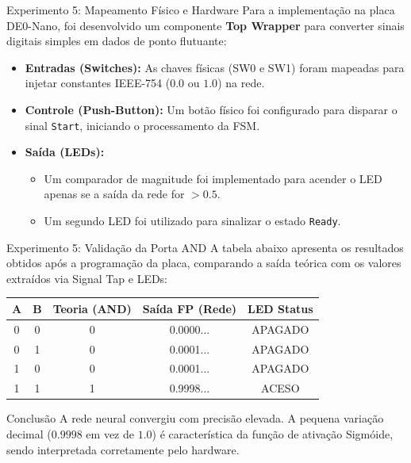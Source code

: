 \documentclass[aspectratio=169]{beamer}
\begin{document}
\begin{frame}{Experimento 5: Mapeamento Físico e Hardware}
	\justifying
	Para a implementação na placa DE0-Nano, foi desenvolvido um componente \textbf{Top Wrapper} para converter sinais digitais simples em dados de ponto flutuante:
	
	\begin{itemize}
		\item \textbf{Entradas (Switches):} As chaves físicas (SW0 e SW1) foram mapeadas para injetar constantes IEEE-754 ($0.0$ ou $1.0$) na rede.
		\item \textbf{Controle (Push-Button):} Um botão físico foi configurado para disparar o sinal \texttt{Start}, iniciando o processamento da FSM.
		\item \textbf{Saída (LEDs):} 
		\begin{itemize}
			\item Um comparador de magnitude foi implementado para acender o LED apenas se a saída da rede for $> 0.5$.
			\item Um segundo LED foi utilizado para sinalizar o estado \texttt{Ready}.
		\end{itemize}
	\end{itemize}
\end{frame}



\begin{frame}{Experimento 5: Validação da Porta AND}
	\justifying
	A tabela abaixo apresenta os resultados obtidos após a programação da placa, comparando a saída teórica com os valores extraídos via Signal Tap e LEDs:
	
	\begin{table}
		\centering
		\small
		\begin{tabular}{|c|c|c|c|c|}
			\hline
			\textbf{A} & \textbf{B} & \textbf{Teoria (AND)} & \textbf{Saída FP (Rede)} & \textbf{LED Status} \\ \hline
			0 & 0 & 0 & 0.0000... & APAGADO \\ \hline
			0 & 1 & 0 & 0.0001... & APAGADO \\ \hline
			1 & 0 & 0 & 0.0001... & APAGADO \\ \hline
			1 & 1 & 1 & 0.9998... & ACESO \\ \hline
		\end{tabular}
	\end{table}
	
	\begin{block}{Conclusão}
		A rede neural convergiu com precisão elevada. A pequena variação decimal ($0.9998$ em vez de $1.0$) é característica da função de ativação Sigmóide, sendo interpretada corretamente pelo hardware.
	\end{block}
\end{frame}
\end{document}
